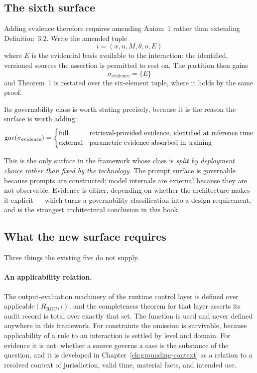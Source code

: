 \subsection{The sixth surface}

Adding evidence therefore requires amending Axiom~1 rather than extending
Definition~3.2. Write the amended tuple
\begin{equation}
  i = (x, u, M, \theta, o, E)
  \label{eq:meta-amended-tuple}
\end{equation}
where $E$ is the evidential basis available to the interaction: the identified,
versioned sources the assertion is permitted to rest on. The partition then gains
\begin{equation}
  \sigma_{\mathrm{evidence}} = \{E\}
  \label{eq:meta-evidence-surface}
\end{equation}
and Theorem~1 is restated over the six-element tuple, where it holds by the same proof.

Its governability class is worth stating precisely, because it is the reason the surface
is worth adding:
\begin{equation}
  \operatorname{gov}(\sigma_{\mathrm{evidence}}) =
  \begin{cases}
    \text{full}    & \text{retrieval-provided evidence, identified at inference time}\\
    \text{external}& \text{parametric evidence absorbed in training}
  \end{cases}
  \label{eq:meta-evidence-governability}
\end{equation}

This is the only surface in the framework whose class is \emph{split by deployment
choice rather than fixed by the technology}. The prompt surface is governable because
prompts are constructed; model internals are external because they are not observable.
Evidence is either, depending on whether the architecture makes it explicit --- which
turns a governability classification into a design requirement, and is the strongest
architectural conclusion in this book.

\subsection{What the new surface requires}

Three things the existing five do not supply.

\paragraph{An applicability relation.} The output-evaluation machinery of the runtime
control layer is defined over $\mathrm{applicable}(R_{\mathrm{ROC}}, i)$, and the
completeness theorem for that layer asserts its audit record is total over exactly that
set. The function is used and never defined anywhere in this framework. For constraints
the omission is survivable, because applicability of a rule to an interaction is
settled by level and domain. For evidence it is not: whether a source governs a case is
the substance of the question, and it is developed in
Chapter~\ref{ch:grounding-context} as a relation to a resolved context of jurisdiction,
valid time, material facts, and intended use.

